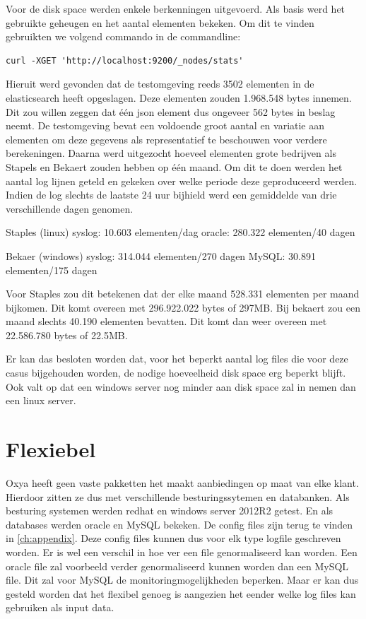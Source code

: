 Voor de disk space werden enkele berkenningen uitgevoerd. Als basis werd het gebruikte geheugen en het aantal elementen bekeken. Om dit te vinden gebruikten we volgend commando in de commandline:
\lstset{escapechar=@,style=customc}        
\begin{lstlisting}[frame=single]  
	curl -XGET 'http://localhost:9200/_nodes/stats'
\end{lstlisting}
Hieruit werd gevonden dat de testomgeving reeds 3502 elementen in de elasticsearch heeft opgeslagen. Deze elementen zouden 1.968.548 bytes innemen.
Dit zou willen zeggen dat één json element dus ongeveer 562 bytes in beslag neemt.
De testomgeving bevat een voldoende groot aantal en variatie aan elementen om deze gegevens als representatief te beschouwen voor verdere berekeningen.
Daarna werd uitgezocht hoeveel elementen grote bedrijven als Stapels en Bekaert zouden hebben op één maand. Om dit te doen werden het aantal log lijnen geteld en gekeken over welke periode deze geproduceerd werden.
Indien de log slechts de laatste 24 uur bijhield werd een gemiddelde van drie verschillende dagen genomen. 

Staples (linux)
syslog:  10.603 elementen/dag
oracle: 280.322 elementen/40 dagen

Bekaer (windows)
syslog: 314.044 elementen/270 dagen
MySQL:   30.891 elementen/175 dagen

Voor Staples zou dit betekenen dat der elke maand 528.331 elementen per maand bijkomen. Dit komt overeen met 296.922.022 bytes of 297MB.
Bij bekaert zou een maand slechts 40.190 elementen bevatten. Dit komt dan weer overeen met 22.586.780 bytes of 22.5MB.

Er kan das besloten worden dat, voor het beperkt aantal log files die voor deze casus bijgehouden worden, de nodige hoeveelheid disk space erg beperkt blijft. 
Ook valt op dat een windows server nog minder aan disk space zal in nemen dan een linux server.

\section{Flexiebel}
\label{sec:flexiebel}

Oxya heeft geen vaste pakketten het maakt aanbiedingen op maat van elke klant. Hierdoor zitten ze dus met verschillende besturingssytemen en databanken.
Als besturing systemen werden redhat en windows server 2012R2 getest. En als databases werden oracle en MySQL bekeken.
De config files zijn terug te vinden in \ref{ch:appendix}. 
Deze config files kunnen dus voor elk type logfile geschreven worden. Er is wel een verschil in hoe ver een file genormaliseerd kan worden.
Een oracle file zal voorbeeld verder genormaliseerd kunnen worden dan een MySQL file. Dit zal voor MySQL de monitoringmogelijkheden beperken.
Maar er kan dus gesteld worden dat het flexibel genoeg is aangezien het eender welke log files kan gebruiken als input data.


